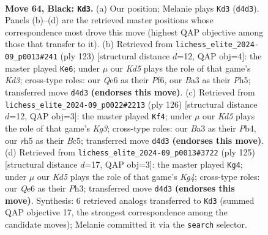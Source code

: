 \documentclass[11pt]{article}
\begin{document}
\clearpage

\begin{figure}[p]\centering
\begin{subfigure}{0.46\textwidth}\centering
\resizebox{\linewidth}{!}{%
\newchessgame
\chessboard[
  setfen={8/8/4q3/7R/1p1k4/b4B2/6K1/8 b - - 19 64},
  showmover=false,
  pgfstyle=straightmove, color=movearrow, markmove={d4-d3}
]}
\caption{}
\end{subfigure}\hfill
\begin{subfigure}{0.46\textwidth}\centering
\resizebox{\linewidth}{!}{%
\newchessgame
\chessboard[
  setfen={8/1R6/3k1p2/7p/3bB2P/5K2/8/8 b - - 0 62},
  showmover=false,
  pgfstyle=straightmove, color=movearrow, markmove={d6-e6}
]}
\caption{}
\end{subfigure}
\\[4pt]
\begin{subfigure}{0.46\textwidth}\centering
\resizebox{\linewidth}{!}{%
\newchessgame
\chessboard[
  setfen={8/8/8/1pB5/1P2b3/3k2K1/8/8 w - - 4 64},
  showmover=false,
  pgfstyle=straightmove, color=movearrow, markmove={g3-f4}
]}
\caption{}
\end{subfigure}\hfill
\begin{subfigure}{0.46\textwidth}\centering
\resizebox{\linewidth}{!}{%
\newchessgame
\chessboard[
  setfen={8/4b3/8/3P2k1/8/6Bp/5K2/8 b - - 5 63},
  showmover=false,
  pgfstyle=straightmove, color=movearrow, markmove={g5-g4}
]}
\caption{}
\end{subfigure}
\caption{\textbf{Move 64, Black: \texttt{Kd3}.} (a) Our position; Melanie plays \texttt{Kd3} (\texttt{d4d3}). Panels (b)--(d) are the retrieved master positions whose correspondence most drove this move (highest QAP objective among those that transfer to it). (b) Retrieved from \texttt{lichess\_elite\_2024-09\_p0013\#241} (ply 123) [structural distance $d$=12, QAP obj=4]: the master played \texttt{Ke6}; under $\mu$ our \emph{Kd5} plays the role of that game's \emph{Kd3}; cross-type roles: our \emph{Q}e6 as their \emph{P}f6, our \emph{B}a3 as their \emph{P}h5; transferred move \texttt{d4d3} \textbf{(endorses this move)}. (c) Retrieved from \texttt{lichess\_elite\_2024-09\_p0022\#2213} (ply 126) [structural distance $d$=12, QAP obj=3]: the master played \texttt{Kf4}; under $\mu$ our \emph{Kd5} plays the role of that game's \emph{Kg3}; cross-type roles: our \emph{B}a3 as their \emph{P}b4, our \emph{r}h5 as their \emph{B}c5; transferred move \texttt{d4d3} \textbf{(endorses this move)}. (d) Retrieved from \texttt{lichess\_elite\_2024-09\_p0013\#3722} (ply 125) [structural distance $d$=17, QAP obj=3]: the master played \texttt{Kg4}; under $\mu$ our \emph{Kd5} plays the role of that game's \emph{Kg4}; cross-type roles: our \emph{Q}e6 as their \emph{P}h3; transferred move \texttt{d4d3} \textbf{(endorses this move)}. Synthesis: 6 retrieved analogs transferred to \texttt{Kd3} (summed QAP objective 17, the strongest correspondence among the candidate moves); Melanie committed it via the \texttt{search} selector.}
\label{fig:thought-m127}
\end{figure}
\end{document}

